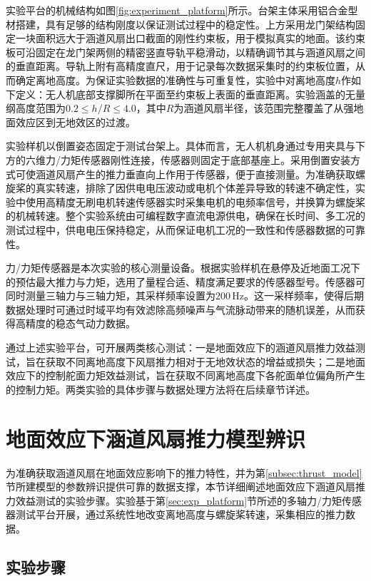 实验平台的机械结构如图\ref{fig:experiment_platform}所示。台架主体采用铝合金型材搭建，具有足够的结构刚度以保证测试过程中的稳定性。上方采用龙门架结构固定一块面积远大于涵道风扇出口截面的刚性约束板，用于模拟真实的地面。该约束板可沿固定在龙门架两侧的精密竖直导轨平稳滑动，以精确调节其与涵道风扇之间的垂直距离。导轨上附有高精度直尺，用于记录每次数据采集时的约束板位置，从而确定离地高度。为保证实验数据的准确性与可重复性，实验中对离地高度$h$作如下定义：无人机底部支撑脚所在平面至约束板上表面的垂直距离。实验涵盖的无量纲高度范围为$0.2 \leq h/R \leq 4.0$，其中$R$为涵道风扇半径，该范围完整覆盖了从强地面效应区到无地效区的过渡。

实验样机以倒置姿态固定于测试台架上。具体而言，无人机机身通过专用夹具与下方的六维力/力矩传感器刚性连接，传感器则固定于底部基座上。采用倒置安装方式可使涵道风扇产生的推力垂直向上作用于传感器，便于直接测量。为准确获取螺旋桨的真实转速，排除了因供电电压波动或电机个体差异导致的转速不确定性，实验中使用高精度无刷电机转速传感器实时采集电机的电频率信号，并换算为螺旋桨的机械转速。整个实验系统由可编程数字直流电源供电，确保在长时间、多工况的测试过程中，供电电压保持稳定，从而保证电机工况的一致性和传感器数据的可靠性。

力/力矩传感器是本次实验的核心测量设备。根据实验样机在悬停及近地面工况下的预估最大推力与力矩，选用了量程合适、精度满足要求的传感器型号。传感器可同时测量三轴力与三轴力矩，其采样频率设置为$200\,\mathrm{Hz}$。这一采样频率，使得后期数据处理时可通过时域平均有效滤除高频噪声与气流脉动带来的随机误差，从而获得高精度的稳态气动力数据。

通过上述实验平台，可开展两类核心测试：一是地面效应下的涵道风扇推力效益测试，旨在获取不同离地高度下风扇推力相对于无地效状态的增益或损失；二是地面效应下的控制舵面力矩效益测试，旨在获取不同离地高度下各舵面单位偏角所产生的控制力矩。两类实验的具体步骤与数据处理方法将在后续章节详述。

\section{地面效应下涵道风扇推力模型辨识}
\label{sec:GE_exp}
为准确获取涵道风扇在地面效应影响下的推力特性，并为第\ref{subsec:thrust_model}节所建模型的参数辨识提供可靠的数据支撑，本节详细阐述地面效应下涵道风扇推力效益测试的实验步骤。实验基于第\ref{sec:exp_platform}节所述的多轴力/力矩传感器测试平台开展，通过系统性地改变离地高度与螺旋桨转速，采集相应的推力数据。

\subsection{实验步骤}

